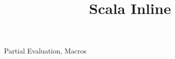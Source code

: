 \documentclass{llncs}
\begin{document}
\title{Scala Inline}

\maketitle

\begin{abstract}
\cite{scala_macros}
\end{abstract}

\keywords
Partial Evaluation, Macros






\end{document}
